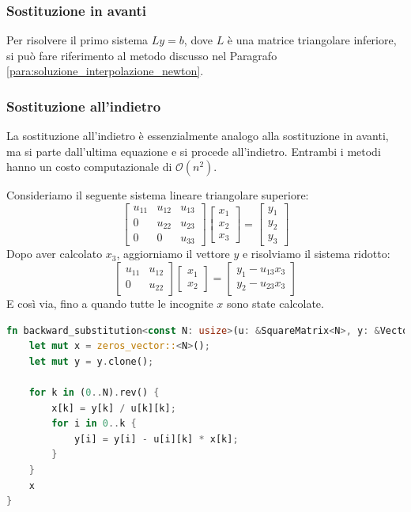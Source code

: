 \documentclass{article}
\begin{document}
\subsubsection{Sostituzione in avanti}
Per risolvere il primo sistema $Ly=b$, dove $L$ è una matrice triangolare inferiore,
si può fare riferimento al metodo discusso nel Paragrafo
\ref{para:soluzione_interpolazione_newton}.
\subsubsection{Sostituzione all'indietro}
La sostituzione all'indietro è essenzialmente analogo alla sostituzione in
avanti, ma si parte dall'ultima equazione e si procede all'indietro. Entrambi
i metodi hanno un costo computazionale di $\mathcal{O}(n^2)$.

Consideriamo il seguente sistema lineare triangolare superiore:
$$
\begin{bmatrix}
    u_{11} & u_{12} & u_{13} \\ 
    0 & u_{22} & u_{23} \\ 
    0 & 0 & u_{33}
\end{bmatrix} 
\begin{bmatrix}
    x_1 \\ 
    x_2 \\ 
    x_3 
\end{bmatrix} =
\begin{bmatrix}
    y_1 \\ 
    y_2 \\ 
    y_3
\end{bmatrix} 
$$
Dopo aver calcolato $x_3$, aggiorniamo il vettore $y$ e risolviamo il sistema
ridotto:
$$
\begin{bmatrix}
    u_{11} & u_{12} \\ 
    0 & u_{22}
\end{bmatrix}
\begin{bmatrix}
    x_1 \\ 
    x_2 
\end{bmatrix} = 
\begin{bmatrix}
    y_1 - u_{13}x_3\\ 
    y_2 -u_{23}x_3
\end{bmatrix}$$
E così via, fino a quando tutte le incognite $x$ sono state calcolate.
\begin{lstlisting}[language=Rust]
fn backward_substitution<const N: usize>(u: &SquareMatrix<N>, y: &Vector<N>) -> Vector<N> {
    let mut x = zeros_vector::<N>();
    let mut y = y.clone();

    for k in (0..N).rev() {
        x[k] = y[k] / u[k][k];
        for i in 0..k {
            y[i] = y[i] - u[i][k] * x[k];
        }
    }
    x
}
\end{lstlisting}
\end{document}
